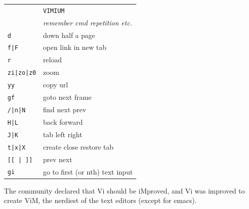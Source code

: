 \documentclass[a4paper,12pt]{article}
\begin{document}
\begin{multicols}{2}
\begin{tabular}{ll}
\\
&\texttt{VIMIUM}\\
&\emph{remember cmd repetition etc.}\\
\texttt{d}&down half a page\\
\texttt{f|F}&open link \textbar{} in new tab\\
\texttt{r}&reload\\
\texttt{zi|zo|z0}&zoom\\
\texttt{yy}&copy url\\
\texttt{gf}&goto next frame\\
\texttt{/|n|N}&find \textbar{} next \textbar{} prev\\
\texttt{H|L}&back \textbar{} forward\\
\texttt{J|K}&tab left \textbar{} right\\
\texttt{t|x|X}&create \textbar{} close \textbar{} restore tab\\
\texttt{[[ | ]]}&prev \textbar{} next\\
\texttt{gi}&go to first (or nth) text input\\
\end{tabular}
\vfill
\columnbreak
The community declared that Vi should be iMproved, and Vi was improved to
create ViM, the nerdiest of the text editors (except for emacs).
\bigskip


\end{multicols}
\end{document}
